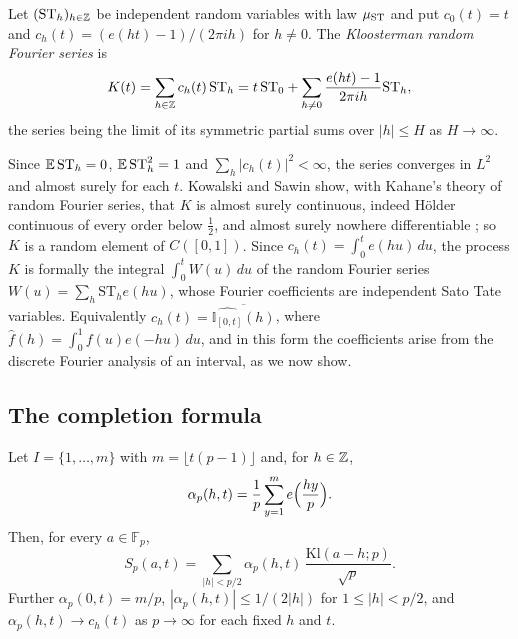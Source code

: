 \begin{definition}\label{def:06bK}
Let $(\mathrm{ST}_h)_{h\in\mathbb{Z}}$ be independent random variables with law $\mu_{\mathrm{ST}}$ and put $c_0(t)=t$ and $c_h(t)=(e(ht)-1)/(2\pi ih)$ for $h\ne0$. The \emph{Kloosterman random Fourier series} is
\[
K(t)=\sum_{h\in\mathbb{Z}}c_h(t)\,\mathrm{ST}_h=t\,\mathrm{ST}_0+\sum_{h\ne0}\frac{e(ht)-1}{2\pi ih}\mathrm{ST}_h ,
\]
the series being the limit of its symmetric partial sums over $|h|\le H$ as $H\to\infty$.
\end{definition}

Since $\mathbb{E}\,\mathrm{ST}_h=0$, $\mathbb{E}\,\mathrm{ST}_h^2=1$ and $\sum_h|c_h(t)|^2<\infty$, the series converges in $L^2$ and almost surely for each $t$. Kowalski and Sawin show, with Kahane's theory of random Fourier series, that $K$ is almost surely continuous, indeed H\"older continuous of every order below $\frac12$, and almost surely nowhere differentiable \cite{kowalskisawin2016}; so $K$ is a random element of $C([0,1])$. Since $c_h(t)=\int_0^te(hu)\,du$, the process $K$ is formally the integral $\int_0^tW(u)\,du$ of the random Fourier series $W(u)=\sum_h\mathrm{ST}_he(hu)$, whose Fourier coefficients are independent Sato Tate variables. Equivalently $c_h(t)=\overline{\widehat{\mathbb{I}_{[0,t]}}(h)}$, where $\hat f(h)=\int_0^1f(u)e(-hu)\,du$, and in this form the coefficients arise from the discrete Fourier analysis of an interval, as we now show.

\subsection{The completion formula}

\begin{lemma}[Completion]\label{lem:06bcompletion}
Let $I=\{1,\dots,m\}$ with $m=\lfloor t(p-1)\rfloor$ and, for $h\in\mathbb{Z}$,
\[
\alpha_p(h,t)=\frac1p\sum_{y=1}^me\Bigl(\frac{hy}{p}\Bigr).
\]
Then, for every $a\in\mathbb{F}_p$,
\begin{equation}\label{eq:06bcompletion}
S_p(a,t)=\sum_{|h|<p/2}\alpha_p(h,t)\,\frac{\mathrm{Kl}(a-h;p)}{\sqrt p}.
\end{equation}
Further $\alpha_p(0,t)=m/p$, $|\alpha_p(h,t)|\le 1/(2|h|)$ for $1\le|h|<p/2$, and $\alpha_p(h,t)\to c_h(t)$ as $p\to\infty$ for each fixed $h$ and $t$.
\end{lemma}

